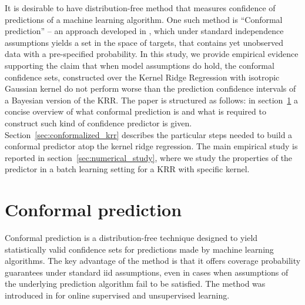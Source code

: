 \documentclass[10pt, conference, compsocconf]{IEEEtran}
\begin{document}
It is desirable to have distribution-free method that measures confidence of predictions
of a machine learning algorithm. One such method is ``Conformal prediction'' -- an
approach developed in \cite{vovk2005}, which under standard independence assumptions
yields a set in the space of targets, that contains yet unobserved data with a pre-specified
probability. In this study, we provide empirical evidence supporting the claim that
when model assumptions do hold, the conformal confidence sets, constructed over the
Kernel Ridge Regression with isotropic Gaussian kernel do not perform worse than
the prediction confidence intervals of a Bayesian version of the KRR. The paper is
structured as follows: in section~\ref{sec:conformal_prediction} a concise overview
of what conformal prediction is and what is required to construct such kind of confidence
predictor is given. Section~\ref{sec:conformalized_krr} describes the particular steps
needed to build a conformal predictor atop the kernel ridge regression. The main
empirical study is reported in section~\ref{sec:numerical_study}, where we study the
properties of the predictor in a batch learning setting for a KRR with specific kernel. 


\section{Conformal prediction} %
\label{sec:conformal_prediction}

Conformal prediction is a distribution-free technique designed to yield statistically
valid confidence sets for predictions made by machine learning algorithms. The key
advantage of the method is that it offers coverage probability guarantees under
standard iid assumptions, even in cases when assumptions of the underlying prediction
algorithm fail to be satisfied. The method was introduced in \cite{vovk2005} for online
supervised and unsupervised learning.
\end{document}
